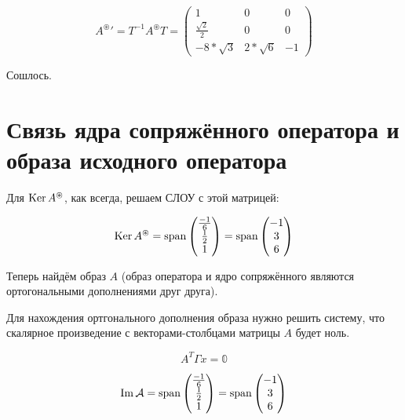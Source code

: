 \documentclass[12pt, a4paper]{article}
\begin{document}
    \begin{equation}
        {A^{\circledast}}' = T^{-1} A^{\circledast} T = \left(\begin{matrix}
            1 & 0 & 0 \\
            \frac{\sqrt{2}}{2} & 0 & 0 \\
            -8*\sqrt{3} & 2*\sqrt{6} & -1
        \end{matrix}\right)
    \end{equation}

    Сошлось.

    \section{Связь ядра сопряжённого оператора и образа исходного оператора}

    Для $\operatorname{Ker} A^{\circledast}$, как всегда, решаем СЛОУ с этой матрицей:

    \begin{equation}
        \operatorname{Ker} A^{\circledast} = \operatorname{span} \left(\begin{matrix}
            \frac{-1}{6} \\
            \frac{1}{2} \\
            1
        \end{matrix}\right) = \operatorname{span} \left(\begin{matrix}
            -1 \\
            3 \\
            6
        \end{matrix}\right)
    \end{equation}

    Теперь найдём образ $A$
    (образ оператора и ядро сопряжённого являются ортогональными дополнениями друг друга).

    Для нахождения ортгонального дополнения образа
    нужно решить систему, что скалярное произведение 
    с векторами-столбцами матрицы $A$ будет ноль.
    
    \begin{equation}
        A^T \Gamma x = \mathbb{0}
    \end{equation}

    \begin{equation}
        \operatorname{Im} \mathcal{A} = \operatorname{span} \left(\begin{matrix}
            \frac{-1}{6} \\
            \frac{1}{2} \\
            1
        \end{matrix}\right) = \operatorname{span} \left(\begin{matrix}
            -1 \\
            3 \\
            6
        \end{matrix}\right)
    \end{equation}
\end{document}
